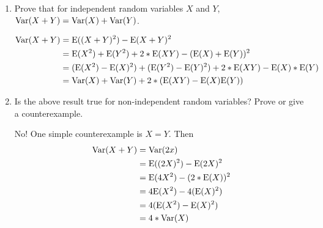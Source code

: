 \question 
\begin{enumerate}[label=\alph*.]
\item Prove that for independent random variables $X$ and $Y$, 
$\text{Var}(X + Y) = \text{Var}(X) + \text{Var}(Y)$.
\begin{solution}[3 cm]
\begin{equation}
\begin{split}
\text{Var}(X + Y) &= \text{E}((X + Y)^2) - \text{E}(X + Y)^2 \\ \nonumber
&= \text{E}(X^2) + \text{E}(Y^2) + 2*\text{E}(XY) - (\text{E}(X) + \text{E}(Y))^2 \\
&= (\text{E}(X^2) - \text{E}(X)^2) + (\text{E}(Y^2)-\text{E}(Y)^2) + 2*\text{E}(XY) - \text{E}(X)*\text{E}(Y) \\
&= \text{Var}(X) + \text{Var}(Y) + 2 * (\text{E}(XY) - \text{E}(X)\text{E}(Y))
\end{split}
\end{equation}
\end{solution}

\item Is the above result true for non-independent random variables? 
Prove or give a counterexample.
\begin{solution}[4cm]
No! One simple counterexample is $X = Y$. Then
\begin{equation}
\begin{split}
\text{Var}(X + Y) &= \text{Var}(2x) \\ \nonumber
&= \text{E}((2X)^2) - \text{E}(2X)^2 \\
&= \text{E}(4X^2) - (2*\text{E}(X))^2 \\
&= 4\text{E}(X^2) - 4(\text{E}(X)^2) \\
&= 4 (\text{E}(X^2) - \text{E}(X)^2) \\
&= 4*\text{Var}(X)
\end{split}
\end{equation}
\end{solution}

\end{enumerate}